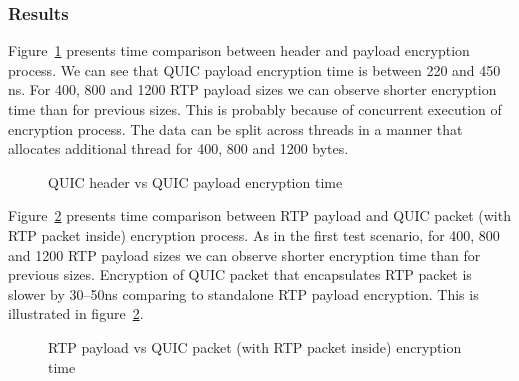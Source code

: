 \subsubsection{Results}
Figure~\ref{fig:header-payload-enc} presents time comparison between header and payload encryption process.
We can see that QUIC payload encryption time is between 220 and 450 ns.
For 400, 800 and 1200 RTP payload sizes we can observe shorter encryption time than for previous sizes.
This is probably because of concurrent execution of encryption process.
The data can be split across threads in a manner that allocates additional thread for 400, 800 and 1200 bytes.

\begin{figure}[h]
    \centering
    \caption{QUIC header vs QUIC payload encryption time}
    \label{fig:header-payload-enc}
\end{figure}

Figure~\ref{fig:rtp-payload-quic-packet-enc} presents time comparison between RTP payload and QUIC packet (with RTP packet inside) encryption process.
As in the first test scenario, for 400, 800 and 1200 RTP payload sizes we can observe shorter encryption time than for previous sizes.
Encryption of QUIC packet that encapsulates RTP packet is slower by 30--50ns comparing to standalone RTP payload encryption.
This is illustrated in figure~\ref{fig:rtp-payload-quic-packet-enc}.

\begin{figure}[!h]
    \centering
    \caption{RTP payload vs QUIC packet (with RTP packet inside) encryption time}
    \label{fig:rtp-payload-quic-packet-enc}
\end{figure}

